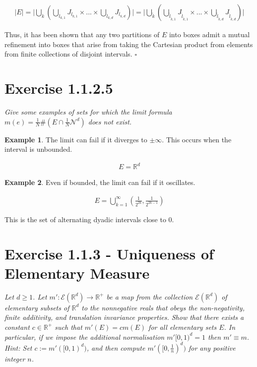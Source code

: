 \documentclass[12pt,letterpaper]{article}
\begin{document}
\begin{equation}
   \begin{aligned}
      \lvert E \rvert
      = \lvert \bigcup_k \left( \bigcup_{l_{k,1}} J_{l_{k,1}} \times ... \times \bigcup_{l_{k,d}} J_{l_{k,d}} \right) \rvert = 
      \lvert \bigcup_{\tilde{k}} \left( \bigcup_{\tilde{l}_{\tilde{k},1}} J_{\tilde{l}_{\tilde{k}, 1}} \times ... \times \bigcup_{\tilde{l}_{\tilde{k},d}} J_{\tilde{l}_{\tilde{k}, d}} \right) \rvert
   \end{aligned}
\end{equation}

Thus, it has been shown that any two partitions of $E$ into boxes admit a mutual refinement into boxes that arise from taking the 
Cartesian product from elements from finite collections of disjoint intervals. $\square$

\section{Exercise 1.1.2.5}

\textit{Give some examples of sets for which the limit formula $m(e) = \frac{1}{N} \#\left( E \cap \frac{1}{N} \mathcal{N}^d \right)$ does not exist.}

\textbf{Example 1}.  The limit can fail if it diverges to $\pm \infty$.
This occurs when the interval is unbounded.

\begin{equation}
   \begin{aligned}
      E = \mathbb{R}^d
   \end{aligned}
\end{equation}

\textbf{Example 2}.  Even if bounded, the limit can fail if it oscillates.

\begin{equation}
   \begin{aligned}
      E = \bigcup_{k=1}^\infty \left( \frac{1}{2^{2k}}, \frac{1}{2^{2k-1}} \right)
   \end{aligned}
\end{equation}

This is the set of alternating dyadic intervals close to 0.

\section{Exercise 1.1.3 - Uniqueness of Elementary Measure}

\textit{Let $d \ge 1$.  Let $m' : \mathcal{E}(\mathbb{R}^d) \to \mathbb{R}^+$ be a map from the collection 
$\mathcal{E}(\mathbb{R}^d)$ of elementary subsets of $\mathbb{R}^d$ to the nonnegative reals that obeys the non-negativity,
finite additivity, and translation invariance properties. Show that
there exists a constant $c \in \mathbb{R}^+$ such that $m'(E) = cm(E)$ for all elementary sets $E$.
In particular, if we impose the additional normalisation $m'[0,1)^d = 1$ then $m' \equiv m$.
Hint: Set $c := m'([0,1)^d)$, and then compute $m'([0,\frac{1}{n})^d)$ for any positive integer $n$.}\\
\\
\end{document}
